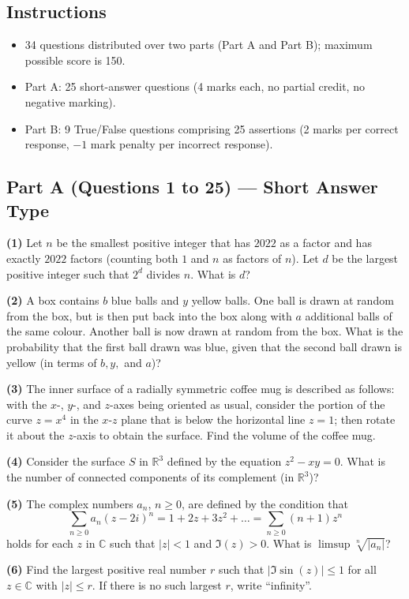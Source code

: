 \documentclass[11pt,a4paper]{article}
\newcommand{\R}{\mathbb{R}}
\newcommand{\C}{\mathbb{C}}
\newcommand{\examsec}[1]{%
  \subsection*{#1}
  \vspace{-2pt}
}
\newcommand{\qitem}[1]{\par\medskip\noindent\textbf{#1}\hspace{0.5em}}
\begin{document}
\subsection*{Instructions}
\begin{itemize}
  \item 34 questions distributed over two parts (Part A and Part B); maximum possible score is 150.
  \item Part A: 25 short-answer questions (4 marks each, no partial credit, no negative marking).
  \item Part B: 9 True/False questions comprising 25 assertions (2 marks per correct response, $-1$ mark penalty per incorrect response).
\end{itemize}

\examsec{Part A (Questions 1 to 25) --- Short Answer Type}

\qitem{(1)} Let $n$ be the smallest positive integer that has $2022$ as a factor and has exactly $2022$ factors (counting both $1$ and $n$ as factors of $n$). Let $d$ be the largest positive integer such that $2^d$ divides $n$. What is $d$?

\qitem{(2)} A box contains $b$ blue balls and $y$ yellow balls. One ball is drawn at random from the box, but is then put back into the box along with $a$ additional balls of the same colour. Another ball is now drawn at random from the box. What is the probability that the first ball drawn was blue, given that the second ball drawn is yellow (in terms of $b, y,$ and $a$)?

\qitem{(3)} The inner surface of a radially symmetric coffee mug is described as follows: with the $x$-, $y$-, and $z$-axes being oriented as usual, consider the portion of the curve $z = x^4$ in the $x$-$z$ plane that is below the horizontal line $z = 1$; then rotate it about the $z$-axis to obtain the surface. Find the volume of the coffee mug.

\qitem{(4)} Consider the surface $S$ in $\R^3$ defined by the equation $z^2 - xy = 0$. What is the number of connected components of its complement (in $\R^3$)?

\qitem{(5)} The complex numbers $a_n$, $n \ge 0$, are defined by the condition that
\[
  \sum_{n \ge 0} a_n(z - 2i)^n = 1 + 2z + 3z^2 + \dots = \sum_{n \ge 0} (n + 1)z^n
\]
holds for each $z$ in $\C$ such that $|z| < 1$ and $\Im(z) > 0$. What is $\limsup \sqrt[n]{|a_n|}$?

\qitem{(6)} Find the largest positive real number $r$ such that $|\Im\sin(z)| \le 1$ for all $z \in \C$ with $|z| \le r$. If there is no such largest $r$, write ``infinity''.
\end{document}
